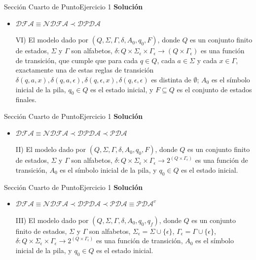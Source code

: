 \documentclass[10pt, envcountsect, presentation, aspectratio=169]{beamer}
\begin{document}

\begin{frame}{Sección Cuarto de Punto}{Ejercicio 1}
    \textbf{Solución}\\
    \begin{itemize}
        \item $\mathcal{DFA} \equiv \mathcal{NDFA} \prec \mathcal{DPDA}$
        \item[VI)] El modelo dado por $(Q,\Sigma,\Gamma,\delta,A_0,q_0,F)$, donde  $Q$ es un conjunto finito de estados, $\Sigma$ y $\Gamma$ son alfabetos, $\delta:Q\times \Sigma_\epsilon\times\Gamma_\epsilon\rightarrow(Q\times\Gamma_\epsilon)$ es  una función de transición, que cumple que para cada $q \in Q$, cada $a \in \Sigma$ y cada $x \in \Gamma$, exactamente una de estas reglas de transición $\delta(q,a,x),\delta(q,a,\epsilon),\delta(q,\epsilon,x),\delta(q,\epsilon,\epsilon)$ es distinta de  $\emptyset$; $A_0$ es el símbolo inicial de la pila, $q_0\in Q$ es el estado inicial, y $F\subseteq Q$ es el conjunto de  estados finales.
    \end{itemize}
\end{frame}


\begin{frame}{Sección Cuarto de Punto}{Ejercicio 1}
    \textbf{Solución}\\
    \begin{itemize}
        \item $\mathcal{DFA} \equiv \mathcal{NDFA} \prec \mathcal{DPDA} \prec \mathcal{PDA}$
        \item[II)] El modelo dado por $(Q,\Sigma,\Gamma,\delta,A_0,q_0,F)$, donde  $Q$ es un conjunto finito de estados,  $\Sigma$ y $\Gamma$ son alfabetos, $\delta:Q\times \Sigma_\epsilon\times\Gamma_\epsilon\rightarrow 2^{(Q\times\Gamma_\epsilon)}$ es  una función de transición, $A_0$ es el símbolo inicial de la pila, y $q_0\in Q$ es el estado inicial. 
    \end{itemize}
\end{frame}


\begin{frame}{Sección Cuarto de Punto}{Ejercicio 1}
    \textbf{Solución}\\
    \begin{itemize}
        \item $\mathcal{DFA} \equiv \mathcal{NDFA} \prec \mathcal{DPDA} \prec \mathcal{PDA} \equiv \mathcal{PDA}^v$
        \item[III)] El modelo dado por $(Q,\Sigma,\Gamma,\delta,A_0,q_0,q_f)$, donde  $Q$ es un conjunto finito de estados, $\Sigma$ y $\Gamma$ son alfabetos, $\Sigma_\epsilon=\Sigma \cup \{\epsilon\}$, $\Gamma_\epsilon=\Gamma \cup \{\epsilon\}$, $\delta:Q\times \Sigma_\epsilon\times\Gamma_\epsilon\rightarrow 2^{(Q\times\Gamma_\epsilon)}$ es  una  función de transición, $A_0$ es el símbolo inicial de la pila, y $q_0\in Q$ es el estado inicial.         
    \end{itemize}
\end{frame}
\end{document}
